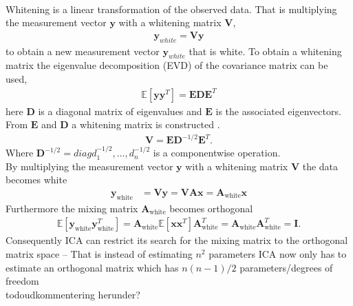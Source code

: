 \\
Whitening is a linear transformation of the observed data. That is multiplying the measurement vector $\textbf{y}$ with a whitening matrix $\textbf{V}$,
\begin{align*}
\textbf{y}_{white} = \textbf{V}\textbf{y}
\end{align*} 
to obtain a new measurement vector $\textbf{y}_{white}$ that is white. To obtain a whitening matrix the eigenvalue decomposition (EVD) of the covariance matrix can be used,
\begin{align*}
\mathbb{E}[\mathbf{yy}^T] = \mathbf{EDE}^T
\end{align*}
here $\mathbf{D}$ is a diagonal matrix of eigenvalues and $\mathbf{E}$ is the associated eigenvectors. From $\mathbf{E}$ and $\mathbf{D}$ a whitening matrix is constructed \cite[p.159]{ICA}.
\begin{align*}
\mathbf{V} = \mathbf{ED}^{-1/2} \mathbf{E}^T.
\end{align*}
Where $\mathbf{D}^{-1/2}=diag{d_1^{-1/2},\hdots,d_n^{-1/2}}$ is a componentwise operation.\\  
By multiplying the measurement vector $\mathbf{y}$ with a whitening matrix $\mathbf{V}$ the data becomes white
\begin{align}
\mathbf{y}_{\text{white}} &= \mathbf{Vy} = \mathbf{VAx} = \mathbf{A}_{\text{white}} \mathbf{x} \nonumber
\end{align}
Furthermore the mixing matrix $\mathbf{A}_{\text{white}}$ becomes orthogonal 
\begin{align*}
 \mathbb{E}[\mathbf{y}_{\text{white}} \mathbf{y}_{\text{white}}^T] = \mathbf{A}_{\text{white}} \mathbb{E}[\mathbf{xx}^T] \mathbf{A}_{\text{white}}^T = \mathbf{A}_{\text{white}} \mathbf{A}_{\text{white}}^T = \mathbf{I}.
 \end{align*} 
Consequently ICA can restrict its search for the mixing matrix to the orthogonal matrix space -- That is instead of estimating $n^2$ parameters ICA now only has to estimate an orthogonal matrix which has $n(n-1)/2$ parameters/degrees of freedom \cite[p. 159]{ICA}\.
\\todo{udkommentering herunder?}

